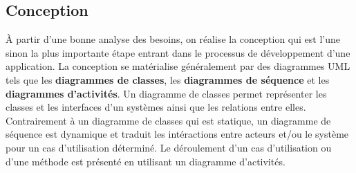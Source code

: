     \subsection{Conception}
    À partir d’une bonne analyse des besoins, on réalise la conception qui est l’une sinon la plus importante étape entrant dans le processus de développement d’une application. La conception se matérialise généralement par des diagrammes UML tels que les \textbf{diagrammes de classes}, les \textbf{diagrammes de séquence} et les \textbf{diagrammes d'activités}. Un diagramme de classes permet représenter les classes et les interfaces d'un systèmes ainsi que les relations entre elles. Contrairement à un diagramme de classes qui est statique, un diagramme de séquence est dynamique et traduit les intéractions entre acteurs et/ou le système pour un cas d'utilisation déterminé. Le déroulement d'un cas d'utilisation ou d'une méthode est présenté en utilisant un diagramme d'activités.
    
